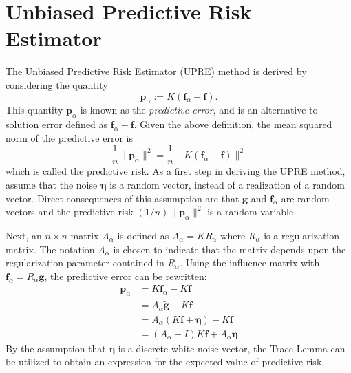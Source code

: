 \documentclass[12pt,notitlepage]{report}
\newcommand{\gVec}{\mathbf{g}}	%
\newcommand{\gnoiseVec}{\widetilde{\mathbf{g}}}	%
\newcommand{\kMat}{K}	%
\newcommand{\fVec}{\mathbf{f}}	%
\newcommand{\regparam}{\alpha}
\newcommand{\R}{R_{\regparam}}	%
\newcommand{\regf}{\fVec_{\regparam}}	%
\newcommand{\noise}{\eta}	%
\newcommand{\noiseVec}{\bm{\noise}}	%
\newcommand{\PE}{\mathbf{p}_{\regparam}}	%
\newcommand{\A}{A_{\regparam}}	%
\begin{document}
\section{Unbiased Predictive Risk Estimator} \label{sec:Unbiased Predictive Risk Estimator}
The Unbiased Predictive Risk Estimator (UPRE) method is derived by considering the quantity
\[\PE := \kMat(\regf - \fVec).\]
This quantity $\PE$ is known as the \textit{predictive error}, and is an alternative to solution error defined as $\regf - \fVec$. Given the above definition, the mean squared norm of the predictive error is
\[\frac{1}{n}\|\PE\|^2 = \frac{1}{n}\|\kMat(\regf - \fVec)\|^2\]
which is called the predictive risk.  As a first step in deriving the UPRE method, assume that the noise $\noiseVec$ is a random vector, instead of a realization of a random vector. Direct consequences of this assumption are that $\gVec$ and $\regf$ are random vectors and the predictive risk $(1/n)\|\PE\|^2$ is a random variable. \par
Next, an $n \times n$ matrix $\A$ is defined as $\A = \kMat\R$ where $\R$ is a regularization matrix. The notation $\A$ is chosen to indicate that the matrix depends upon the regularization parameter contained in $\R$. Using the influence matrix with $\regf = \R\gnoiseVec$, the predictive error can be rewritten:
\begin{align*}
\PE &= \kMat\regf - \kMat\fVec \\
&= \A\gnoiseVec - \kMat\fVec \\
&= \A(\kMat\fVec + \noiseVec) - \kMat\fVec \\
&= (\A - I)\kMat\fVec + \A\noiseVec
\end{align*}
By the assumption that $\noiseVec$ is a discrete white noise vector, the Trace Lemma can be utilized to obtain an expression for the expected value of predictive risk.
\end{document}
